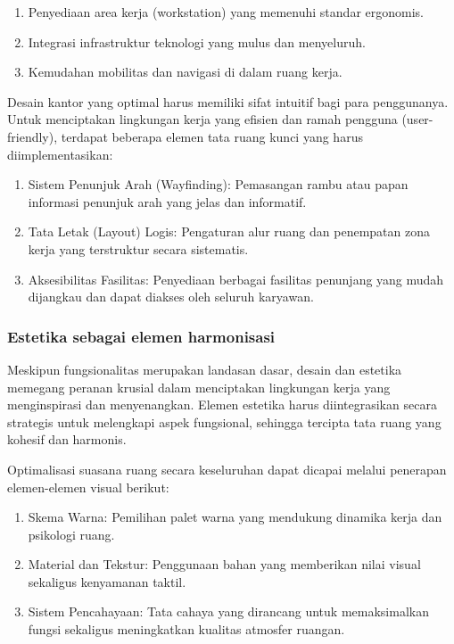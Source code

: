 \documentclass[../manperil.tex]{subfiles}
\begin{document}
\begin{enumerate}
	\item Penyediaan area kerja (workstation) yang memenuhi standar ergonomis.
	\item Integrasi infrastruktur teknologi yang mulus dan menyeluruh.
	\item Kemudahan mobilitas dan navigasi di dalam ruang kerja.
\end{enumerate}


Desain kantor yang optimal harus memiliki sifat intuitif bagi para penggunanya. Untuk menciptakan lingkungan kerja yang efisien dan ramah pengguna (user-friendly), terdapat beberapa elemen tata ruang kunci yang harus diimplementasikan:

\begin{enumerate}
	\item Sistem Penunjuk Arah (Wayfinding): Pemasangan rambu atau papan informasi penunjuk arah yang jelas dan informatif.
	\item Tata Letak (Layout) Logis: Pengaturan alur ruang dan penempatan zona kerja yang terstruktur secara sistematis.
	\item Aksesibilitas Fasilitas: Penyediaan berbagai fasilitas penunjang yang mudah dijangkau dan dapat diakses oleh seluruh karyawan.
\end{enumerate}

\subsubsection{Estetika sebagai elemen harmonisasi}%
\label{sub:estetika_sebagai_elemen_harmonisasi}


Meskipun fungsionalitas merupakan landasan dasar, desain dan estetika memegang peranan krusial dalam menciptakan lingkungan kerja yang menginspirasi dan menyenangkan. Elemen estetika harus diintegrasikan secara strategis untuk melengkapi aspek fungsional, sehingga tercipta tata ruang yang kohesif dan harmonis.

Optimalisasi suasana ruang secara keseluruhan dapat dicapai melalui penerapan elemen-elemen visual berikut:

\begin{enumerate}
	\item Skema Warna: Pemilihan palet warna yang mendukung dinamika kerja dan psikologi ruang.
	\item Material dan Tekstur: Penggunaan bahan yang memberikan nilai visual sekaligus kenyamanan taktil.
	\item Sistem Pencahayaan: Tata cahaya yang dirancang untuk memaksimalkan fungsi sekaligus meningkatkan kualitas atmosfer ruangan.
\end{enumerate}
\end{document}
